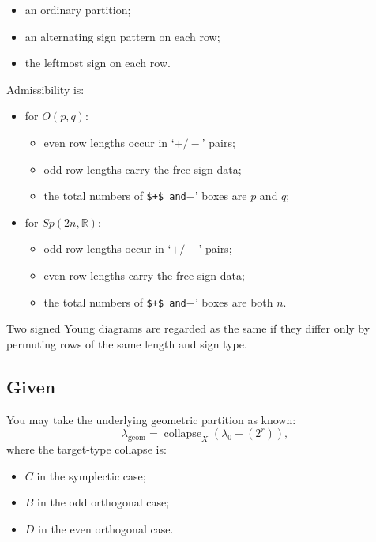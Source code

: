 \documentclass[
]{article}
\providecommand{\tightlist}{%
  \setlength{\itemsep}{0pt}\setlength{\parskip}{0pt}}
\begin{document}
\begin{itemize}
\tightlist
\item
  an ordinary partition;
\item
  an alternating sign pattern on each row;
\item
  the leftmost sign on each row.
\end{itemize}

Admissibility is:

\begin{itemize}
\tightlist
\item
  for \(O(p,q)\):

  \begin{itemize}
  \tightlist
  \item
    even row lengths occur in `\(+/-\)' pairs;
  \item
    odd row lengths carry the free sign data;
  \item
    the total numbers of \texttt{\$+\$\textquotesingle{}\ and}\(-\)'
    boxes are \(p\) and \(q\);
  \end{itemize}
\item
  for \(Sp(2n,\mathbb R)\):

  \begin{itemize}
  \tightlist
  \item
    odd row lengths occur in `\(+/-\)' pairs;
  \item
    even row lengths carry the free sign data;
  \item
    the total numbers of \texttt{\$+\$\textquotesingle{}\ and}\(-\)'
    boxes are both \(n\).
  \end{itemize}
\end{itemize}

Two signed Young diagrams are regarded as the same if they differ only
by permuting rows of the same length and sign type.

\subsection{Given}\label{given}

You may take the underlying geometric partition as known: \[
\lambda_{\mathrm{geom}}=\operatorname{collapse}_X(\lambda_0+(2^r)),
\] where the target-type collapse is:

\begin{itemize}
\tightlist
\item
  \(C\) in the symplectic case;
\item
  \(B\) in the odd orthogonal case;
\item
  \(D\) in the even orthogonal case.
\end{itemize}
\end{document}
